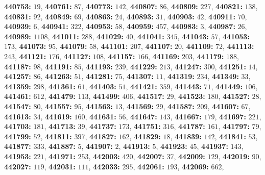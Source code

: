\textsf{\bfseries 440753:} $19$, \textsf{\bfseries 440761:} $87$, \textsf{\bfseries 440773:} $142$, \textsf{\bfseries 440807:} $86$, \textsf{\bfseries 440809:} $227$, \textsf{\bfseries 440821:} $138$, \textsf{\bfseries 440831:} $92$, \textsf{\bfseries 440849:} $69$, \textsf{\bfseries 440863:} $24$, \textsf{\bfseries 440893:} $31$, \textsf{\bfseries 440903:} $42$, \textsf{\bfseries 440911:} $70$, \textsf{\bfseries 440939:} $6$, \textsf{\bfseries 440941:} $322$, \textsf{\bfseries 440953:} $58$, \textsf{\bfseries 440959:} $457$, \textsf{\bfseries 440983:} $3$, \textsf{\bfseries 440987:} $26$, \textsf{\bfseries 440989:} $1108$, \textsf{\bfseries 441011:} $288$, \textsf{\bfseries 441029:} $40$, \textsf{\bfseries 441041:} $345$, \textsf{\bfseries 441043:} $57$, \textsf{\bfseries 441053:} $173$, \textsf{\bfseries 441073:} $95$, \textsf{\bfseries 441079:} $58$, \textsf{\bfseries 441101:} $207$, \textsf{\bfseries 441107:} $20$, \textsf{\bfseries 441109:} $72$, \textsf{\bfseries 441113:} $243$, \textsf{\bfseries 441121:} $176$, \textsf{\bfseries 441127:} $108$, \textsf{\bfseries 441157:} $166$, \textsf{\bfseries 441169:} $203$, \textsf{\bfseries 441179:} $188$, \textsf{\bfseries 441187:} $98$, \textsf{\bfseries 441191:} $85$, \textsf{\bfseries 441193:} $239$, \textsf{\bfseries 441229:} $213$, \textsf{\bfseries 441247:} $300$, \textsf{\bfseries 441251:} $14$, \textsf{\bfseries 441257:} $86$, \textsf{\bfseries 441263:} $51$, \textsf{\bfseries 441281:} $75$, \textsf{\bfseries 441307:} $11$, \textsf{\bfseries 441319:} $234$, \textsf{\bfseries 441349:} $33$, \textsf{\bfseries 441359:} $298$, \textsf{\bfseries 441361:} $61$, \textsf{\bfseries 441403:} $51$, \textsf{\bfseries 441421:} $359$, \textsf{\bfseries 441443:} $71$, \textsf{\bfseries 441449:} $106$, \textsf{\bfseries 441461:} $612$, \textsf{\bfseries 441479:} $113$, \textsf{\bfseries 441499:} $406$, \textsf{\bfseries 441517:} $29$, \textsf{\bfseries 441523:} $180$, \textsf{\bfseries 441527:} $28$, \textsf{\bfseries 441547:} $80$, \textsf{\bfseries 441557:} $95$, \textsf{\bfseries 441563:} $13$, \textsf{\bfseries 441569:} $29$, \textsf{\bfseries 441587:} $209$, \textsf{\bfseries 441607:} $67$, \textsf{\bfseries 441613:} $34$, \textsf{\bfseries 441619:} $160$, \textsf{\bfseries 441631:} $56$, \textsf{\bfseries 441647:} $143$, \textsf{\bfseries 441667:} $179$, \textsf{\bfseries 441697:} $221$, \textsf{\bfseries 441703:} $181$, \textsf{\bfseries 441713:} $39$, \textsf{\bfseries 441737:} $173$, \textsf{\bfseries 441751:} $316$, \textsf{\bfseries 441787:} $161$, \textsf{\bfseries 441797:} $79$, \textsf{\bfseries 441799:} $52$, \textsf{\bfseries 441811:} $397$, \textsf{\bfseries 441827:} $162$, \textsf{\bfseries 441829:} $18$, \textsf{\bfseries 441839:} $142$, \textsf{\bfseries 441841:} $53$, \textsf{\bfseries 441877:} $333$, \textsf{\bfseries 441887:} $5$, \textsf{\bfseries 441907:} $2$, \textsf{\bfseries 441913:} $5$, \textsf{\bfseries 441923:} $45$, \textsf{\bfseries 441937:} $143$, \textsf{\bfseries 441953:} $221$, \textsf{\bfseries 441971:} $253$, \textsf{\bfseries 442003:} $420$, \textsf{\bfseries 442007:} $37$, \textsf{\bfseries 442009:} $129$, \textsf{\bfseries 442019:} $90$, \textsf{\bfseries 442027:} $119$, \textsf{\bfseries 442031:} $111$, \textsf{\bfseries 442033:} $295$, \textsf{\bfseries 442061:} $193$, \textsf{\bfseries 442069:} $662$, 
